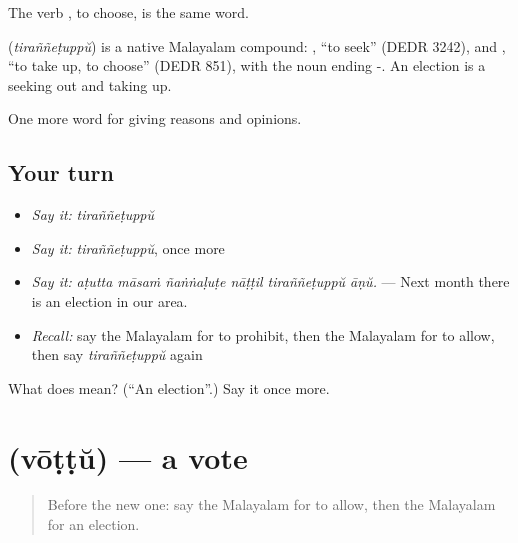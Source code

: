 The verb , to choose, is the same word.

\begin{cousinweb}
\textbf{} (\emph{tiraññeṭuppŭ}) is a native Malayalam compound: , \textquotedblleft{}to seek\textquotedblright{} (DEDR 3242), and , \textquotedblleft{}to take up, to choose\textquotedblright{} (DEDR 851), with the noun ending -. An election is a seeking out and taking up.
\end{cousinweb}

\begin{grammarlens}[title={What you've built}]
One more word for giving reasons and opinions.
\end{grammarlens}

\subsection*{Your turn}
\begin{itemize}
\raggedright
  \item \emph{Say it:} \emph{tiraññeṭuppŭ}
  \item \emph{Say it:} \emph{tiraññeṭuppŭ}, once more
  \item \emph{Say it:} \emph{aṭutta māsaṁ ñaṅṅaḷuṭe nāṭṭil tiraññeṭuppŭ āṇŭ.} — Next month there is an election in our area.
  \item \emph{Recall:} say the Malayalam for to prohibit, then the Malayalam for to allow, then say \emph{tiraññeṭuppŭ} again
\end{itemize}

\begin{tcolorbox}[breakable,colback=teal!4,colframe=teal!35!black,title={Before you move on}]
What does  mean? (\textquotedblleft{}An election\textquotedblright{}.) Say it once more.
\end{tcolorbox}
\section[\texorpdfstring{\ml{വോട്ട്} (vōṭṭŭ)}{വോട്ട് (vōṭṭŭ)}]{ (vōṭṭŭ) — a vote}

\label{lesson:ML-C419-vottu}



\begin{quote}
Before the new one: say the Malayalam for to allow, then the Malayalam for an election.
\end{quote}

